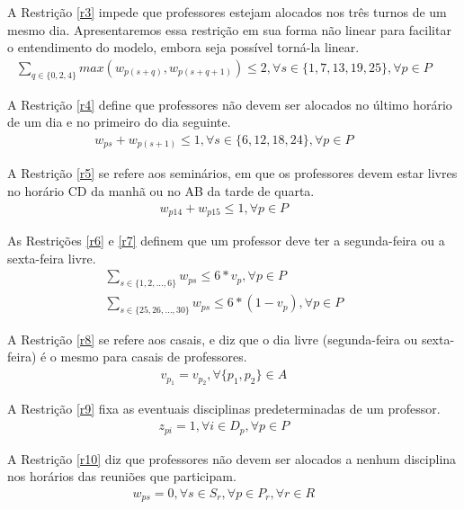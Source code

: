 A Restrição \ref{r3} impede que professores estejam alocados nos três turnos de um mesmo dia. Apresentaremos essa restrição em sua forma não linear para facilitar o entendimento do modelo, embora seja possível torná-la linear.
\begin{eqnarray}
\label{r3}
\sum_{q\in\{{0,2,4}\}}^{}{max(w_{p(s+q)}, w_{p(s+q+1)})}  \leq 2, \forall{s}\in{\{1,7,13,19,25\}}, \forall{p}\in{P}  &&
\end{eqnarray}

A Restrição \ref{r4} define que professores não devem ser alocados no último horário de um dia e no primeiro do dia seguinte.
\begin{eqnarray}
\label{r4}
w_{ps} + w_{p(s+1)}  \leq 1, \forall{s}\in{\{6, 12, 18, 24\}}, \forall{p}\in{P}  &&
\end{eqnarray}

A Restrição \ref{r5} se refere aos seminários, em que os professores devem estar livres no horário CD da manhã ou no AB da tarde de quarta.
\begin{eqnarray}
\label{r5}
w_{p14} + w_{p15} \leq 1, \forall{p\in{P}} &&
\end{eqnarray}

As Restrições \ref{r6} e \ref{r7} definem que um professor deve ter a segunda-feira ou a sexta-feira livre.
\begin{eqnarray}
\label{r6}
\sum_{s\in\{{1, 2, ..., 6}\}}{w_{ps}} \leq 6*v_p, \forall{p \in{P}} &&\\
\label{r7}
\sum_{s\in\{{25, 26, ..., 30}\}}{w_{ps}} \leq 6*(1-v_p), \forall{p \in{P}} &&
\end{eqnarray}

A Restrição \ref{r8} se refere aos casais, e diz que o dia livre (segunda-feira ou sexta-feira) é o mesmo para casais de professores.
\begin{eqnarray}
\label{r8}
v_{p_1} = v_{p_2}, \forall{\{p_1,p_2\} \in{A}} &&
\end{eqnarray}

A Restrição \ref{r9} fixa as eventuais disciplinas predeterminadas de um professor.
\begin{eqnarray}
\label{r9}
z_{pi} = 1, \forall{i \in{D_p}}, \forall{p \in{P}} &&
\end{eqnarray}

A Restrição \ref{r10} diz que professores não devem ser alocados a nenhum disciplina nos horários das reuniões que participam.
\begin{eqnarray}
\label{r10}
w_{ps} = 0, \forall{s \in{S_r}}, \forall{p \in{P_r}}, \forall{r \in{R}} &&
\end{eqnarray}

